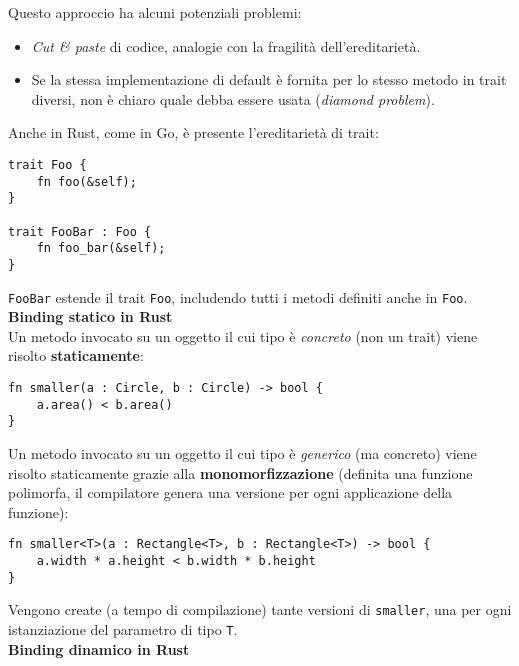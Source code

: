 \documentclass{article}
\begin{document}
Questo approccio ha alcuni potenziali problemi:
\begin{itemize}
    \item \textit{Cut \& paste} di codice, analogie con la fragilità dell’ereditarietà.
    \item Se la stessa implementazione di default è fornita per lo stesso metodo in trait diversi, non è chiaro quale debba essere usata (\textit{diamond problem}).
\end{itemize}

\pagebreak

Anche in Rust, come in Go, è presente l'ereditarietà di trait:
\begin{tcolorbox}
\begin{verbatim}
trait Foo {
    fn foo(&self);
}

trait FooBar : Foo {
    fn foo_bar(&self);
}
\end{verbatim}
\end{tcolorbox}
\texttt{FooBar} estende il trait \texttt{Foo}, includendo tutti i metodi definiti anche in \texttt{Foo}.\vspace{14pt}\\
\textbf{Binding statico in Rust}\\
Un metodo invocato su un oggetto il cui tipo è \textit{concreto} (non un trait) viene risolto \textbf{staticamente}:
\begin{tcolorbox}
\begin{verbatim}
fn smaller(a : Circle, b : Circle) -> bool {
    a.area() < b.area()
}
\end{verbatim}
\end{tcolorbox}
\vspace{8pt}
Un metodo invocato su un oggetto il cui tipo è \textit{generico} (ma concreto) viene risolto staticamente grazie alla \textbf{monomorfizzazione} (definita una funzione polimorfa, il compilatore genera una versione per ogni applicazione della funzione):
\begin{tcolorbox}
\begin{verbatim}
fn smaller<T>(a : Rectangle<T>, b : Rectangle<T>) -> bool {
    a.width * a.height < b.width * b.height
}
\end{verbatim}
\end{tcolorbox}
Vengono create (a tempo di compilazione) tante versioni di \texttt{smaller}, una per ogni istanziazione del parametro di tipo \texttt{T}.\vspace{14pt}\\
\textbf{Binding dinamico in Rust}\\
\end{document}
